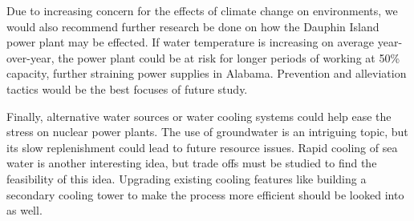 \documentclass[
  letterpaper,
  DIV=11,
  numbers=noendperiod]{scrreprt}
\begin{document}
Due to increasing concern for the effects of climate change on
environments, we would also recommend further research be done on how
the Dauphin Island power plant may be effected. If water temperature is
increasing on average year-over-year, the power plant could be at risk
for longer periods of working at 50\% capacity, further straining power
supplies in Alabama. Prevention and alleviation tactics would be the
best focuses of future study.

Finally, alternative water sources or water cooling systems could help
ease the stress on nuclear power plants. The use of groundwater is an
intriguing topic, but its slow replenishment could lead to future
resource issues. Rapid cooling of sea water is another interesting idea,
but trade offs must be studied to find the feasibility of this idea.
Upgrading existing cooling features like building a secondary cooling
tower to make the process more efficient should be looked into as well.
\end{document}
